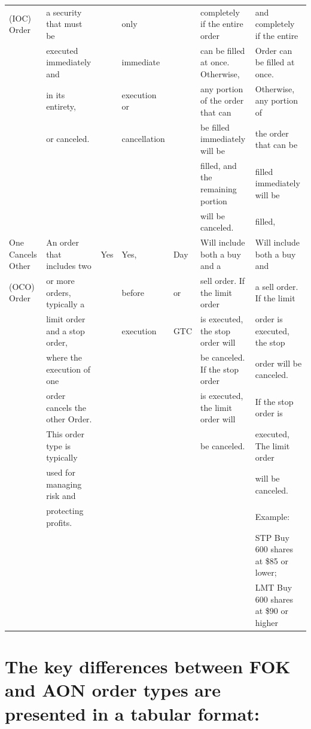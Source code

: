 \documentclass[11pt]{article}
\begin{document}
\begin{center}
\begin{tabular}{lllllll}
(IOC) Order & a security that must be &  & only &  & completely if the entire order & and completely if the entire\\[0pt]
 & executed immediately and &  & immediate &  & can be filled at once. Otherwise, & Order can be filled at once.\\[0pt]
 & in its entirety, &  & execution or &  & any portion of the order that can & Otherwise, any portion of\\[0pt]
 & or canceled. &  & cancellation &  & be filled immediately will be & the order that can be\\[0pt]
 &  &  &  &  & filled, and the remaining portion & filled immediately will be\\[0pt]
 &  &  &  &  & will be canceled. & filled,\\[0pt]
\hline
One Cancels Other & An order that includes two & Yes & Yes, & Day & Will include both a buy and a & Will include both a buy and\\[0pt]
(OCO) Order & or more orders, typically a &  & before & or & sell order. If the limit order & a sell order. If the limit\\[0pt]
 & limit order and a stop order, &  & execution & GTC & is executed, the stop order will & order is executed, the stop\\[0pt]
 & where the execution of one &  &  &  & be canceled. If the stop order & order will be canceled.\\[0pt]
 & order cancels the other Order. &  &  &  & is executed, the limit order will & If the stop order is\\[0pt]
 & This order type is typically &  &  &  & be canceled. & executed, The limit order\\[0pt]
 & used for managing risk and &  &  &  &  & will be canceled.\\[0pt]
 & protecting profits. &  &  &  &  & Example:\\[0pt]
 &  &  &  &  &  & STP Buy 600 shares at \$85 or lower;\\[0pt]
 &  &  &  &  &  & LMT Buy 600 shares at \$90 or higher\\[0pt]
\hline
\end{tabular}
\end{center}
\section{The key differences between FOK and AON order types are presented in a tabular format:}
\label{sec:orga76bfc7}
\end{document}
